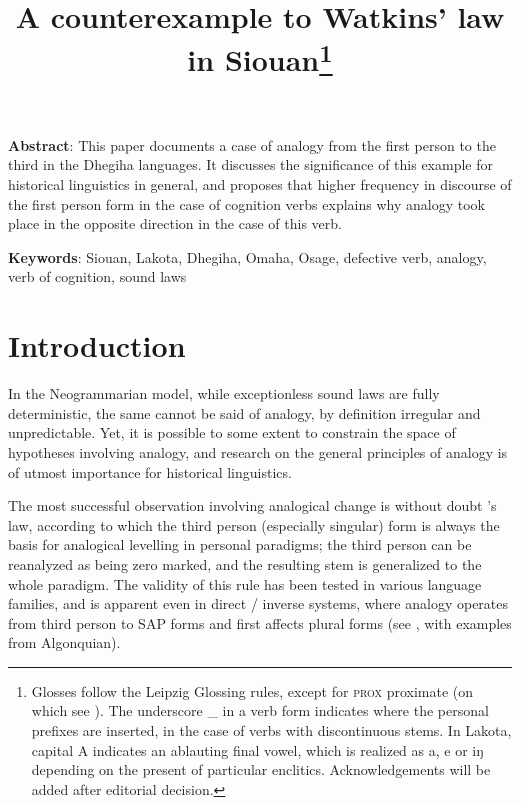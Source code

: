 \documentclass[oldfontcommands,oneside,a4paper,11pt]{article}
\newcommand{\ipa}[1]{{\phon#1}} %
\begin{document}
 

\title{A counterexample to Watkins' law in Siouan\footnote{Glosses follow the Leipzig Glossing rules, except for \textsc{prox} proximate (on which see \citealt{eschenberg05omaha}). The underscore \_ in a verb form indicates where the personal prefixes are inserted, in the case of verbs with discontinuous stems. In Lakota, capital \ipa{A} indicates an ablauting final vowel, which is realized as \ipa{a}, \ipa{e} or \ipa{iŋ} depending on the present of particular enclitics. Acknowledgements will be added after editorial decision.}}
\maketitle

\textbf{Abstract}: This paper documents a case of analogy from the first person to the third in the Dhegiha languages. It discusses the significance of this example for historical linguistics in general, and proposes that higher frequency in discourse of the first person form in the case of cognition verbs explains why analogy took place in the opposite   direction in the case of this verb.

\textbf{Keywords}: Siouan, Lakota, Dhegiha, Omaha, Osage, defective verb, analogy, verb of cognition, sound laws

\section{Introduction}

In the Neogrammarian model, while exceptionless sound laws are fully deterministic, the same cannot be said of analogy, by definition irregular and unpredictable. Yet, it is possible to some extent to constrain  the space of hypotheses involving analogy, and research on the general principles of analogy is of utmost importance for historical linguistics.

The most successful observation involving analogical change is without doubt \citet{watkins62celtic}'s law, according to which the third person (especially singular) form is always the basis for analogical levelling in personal paradigms; the third person can be reanalyzed as being zero marked, and the resulting stem is generalized to the whole paradigm. The validity of this rule has been tested in various language families, and is apparent even in direct / inverse systems, where analogy operates from third person to SAP forms and first affects plural forms (see \citealt{jacques15directionality}, with examples from Algonquian).
    
\end{document}

